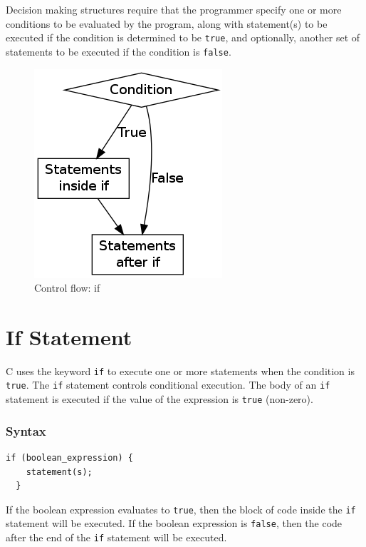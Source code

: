 \documentclass[11pt,a4paper]{article}
\author{TalentSprint}
\date{}
\begin{document}
Decision making structures require that the programmer specify one or more conditions to be evaluated by the program, along with statement(s) to be executed if the condition is determined to be \texttt{true}, and optionally, another set of statements to be executed if the condition is \texttt{false}.

\begin{figure}[ht]

\begin{center}
\includegraphics[scale=0.6]{if.png}
\caption{Control flow: if}
\label{Controlflow:if}
\end{center}
\end{figure}

\section {If Statement}
C uses the keyword \lstinline!if! to execute one or more statements when the condition is \texttt{true}. The \lstinline!if! statement controls conditional execution. The body of an \lstinline!if! statement is executed if the value of the expression is \texttt{true} (non-zero).

\subsubsection*{Syntax}
\begin{lstlisting}[numbers=none]
  if (boolean_expression) {
    statement(s);
  }
\end{lstlisting}
If the boolean expression evaluates to \texttt{true}, then the block of code inside the \lstinline!if! statement will be executed. If the boolean expression is \texttt{false}, then the code after the end of the \lstinline!if! statement will be executed.
\end{document}

